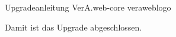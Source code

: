 \documentclass{tarentanleitung}
\begin{document}

\tarentanleitung
 {Upgradeanleitung VerA.web-core}
 {\vwiaverspo}{\vwiaversfassungnr}{\vwiaversfassungmonat}{\vwiaversfassungjahr}{veraweblogo}







Damit ist das Upgrade abgeschlossen.


\end{document}
